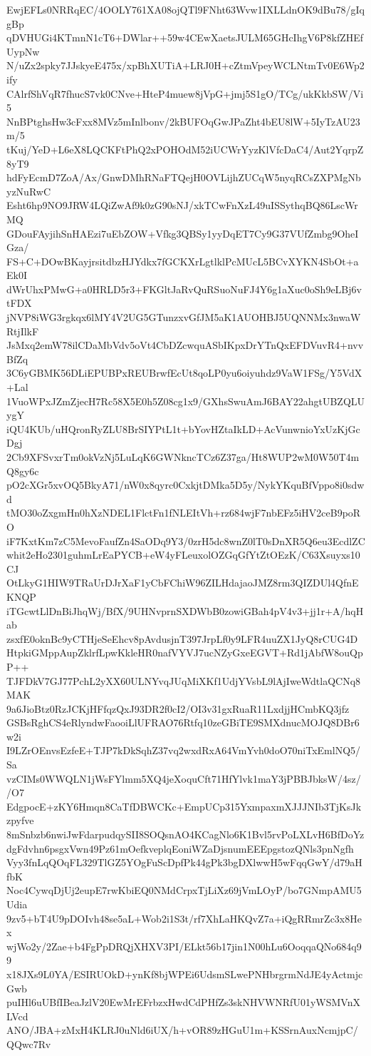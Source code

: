 EwjEFLs0NRRqEC/4OOLY761XA08ojQTl9FNht63Wvw1IXLLdnOK9dBu78/gIqgBp
qDVHUGi4KTmnN1cT6+DWlar++59w4CEwXaetsJULM65GHcIhgV6P8kfZHEfUypNw
N/uZx2spky7JJskyeE475x/xpBhXUTiA+LRJ0H+cZtmVpeyWCLNtmTv0E6Wp2ify
CAlrfShVqR7fhucS7vk0CNve+HteP4muew8jVpG+jmj5S1gO/TCg/ukKkbSW/Vi5
NnBPtghsHw3cFxx8MVz5mInlbonv/2kBUFOqGwJPaZht4bEU8lW+5IyTzAU23m/5
tKuj/YeD+L6eX8LQCKFtPhQ2xPOHOdM52iUCWrYyzKlVfcDaC4/Aut2YqrpZ8yT9
hdFyEcmD7ZoA/Ax/GnwDMhRNaFTQejH0OVLijhZUCqW5nyqRCsZXPMgNbyzNuRwC
Esht6hp9NO9JRW4LQiZwAf9k0zG90sNJ/xkTCwFnXzL49uISSythqBQ86LscWrMQ
GDouFAyjihSnHAEzi7uEbZOW+Vfkg3QBSy1yyDqET7Cy9G37VUfZmbg9OheIGza/
FS+C+DOwBKayjrsitdbzHJYdkx7fGCKXrLgtlklPcMUcL5BCvXYKN4SbOt+aEk0I
dWrUhxPMwG+a0HRLD5r3+FKGltJaRvQuRSuoNuFJ4Y6g1aXuc0oSh9eLBj6vtFDX
jNVP8iWG3rgkqx6lMY4V2UG5GTunzxvGfJM5aK1AUOHBJ5UQNNMx3nwaWRtjIlkF
JsMxq2emW78ilCDaMbVdv5oVt4CbDZcwquASbIKpxDrYTnQxEFDVuvR4+nvvBfZq
3C6yGBMK56DLiEPUBPxREUBrwfEcUt8qoLP0yu6oiyuhdz9VaW1FSg/Y5VdX+Lal
1VuoWPxJZmZjecH7Rc58X5E0h5Z08cg1x9/GXhsSwuAmJ6BAY22ahgtUBZQLUygY
iQU4KUb/uHQronRyZLU8BrSIYPtL1t+bYovHZtaIkLD+AcVunwnioYxUzKjGcDgj
2Cb9XFSvxrTm0okVzNj5LuLqK6GWNkncTCz6Z37ga/Ht8WUP2wM0W50T4mQ8gy6c
pO2cXGr5xvOQ5BkyA71/nW0x8qyrc0CxkjtDMka5D5y/NykYKquBfVppo8i0sdwd
tMO30oZxgmHn0hXzNDEL1FlctFn1fNLEItVh+rz684wjF7nbEFz5iHV2ceB9poRO
iF7KxtKm7zC5MevoFaufZn4SaODq9Y3/0zrH5dc8wnZ0lT0sDnXR5Q6eu3EcdlZC
whit2eHo2301guhmLrEaPYCB+eW4yFLeuxolOZGqGfYtZtOEzK/C63Xsuyxs10CJ
OtLkyG1HIW9TRaUrDJrXaF1yCbFChiW96ZILHdajaoJMZ8rm3QIZDUl4QfnEKNQP
iTGcwtLlDnBiJhqWj/BfX/9UHNvprnSXDWbB0zowiGBah4pV4v3+jj1r+A/hqHab
zsxfE0oknBc9yCTHjeSeEhcv8pAvdusjnT397JrpLf0y9LFR4uuZX1JyQ8rCUG4D
HtpkiGMppAupZklrfLpwKkleHR0nafVYVJ7ucNZyGxeEGVT+Rd1jAbfW8ouQpP++
TJFDkV7GJ77PchL2yXX60ULNYvqJUqMiXKf1UdjYVsbL9lAjIweWdtlaQCNq8MAK
9a6JioBtz0RzJCKjHFfqzQxJ93DR2f0cI2/OI3v31gxRuaR11LxdjjHCmbKQ3jfz
GSBsRghCS4eRlyndwFaooiLlUFRAO76Rtfq10zeGBiTE9SMXdnucMOJQ8DBr6w2i
I9LZrOEnvsEzfeE+TJP7kDkSqhZ37vq2wxdRxA64VmYvh0doO70niTxEmlNQ5/Sa
vzCIMs0WWQLN1jWsFYlmm5XQ4jeXoquCft71HfYlvk1maY3jPBBJbksW/4sz//O7
EdgpocE+zKY6Hmqn8CaTfDBWCKc+EmpUCp315YxmpaxmXJJJNIb3TjKsJkzpyfve
8mSnbzb6nwiJwFdarpudqySII8SOQsnAO4KCagNlo6K1Bvl5rvPoLXLvH6BfDoYz
dgFdvhn6psgxVwn49Pz61mOefkveplqEoniWZaDjsnumEEEpgstozQNls3pnNgfh
Vyy3fnLqQOqFL329TlGZ5YOgFuScDpfPk44gPk3bgDXlwwH5wFqqGwY/d79aHfbK
Noc4CywqDjUj2eupE7rwKbiEQ0NMdCrpxTjLiXz69jVmLOyP/bo7GNmpAMU5Udia
9zv5+bT4U9pDOIvh48se5aL+Wob2i1S3t/rf7XhLaHKQvZ7a+iQgRRmrZc3x8Hex
wjWo2y/2Zae+b4FgPpDRQjXHXV3PI/ELkt56b17jin1N00hLu6OoqqaQNo684q99
x18JXs9L0YA/ESIRUOkD+ynKf8bjWPEi6UdsmSLwePNHbrgrmNdJE4yActmjcGwb
puIHl6uUBfIBeaJzlV20EwMrEFrbzxHwdCdPHfZs3skNHVWNRfU01yWSMVnXLVcd
ANO/JBA+zMxH4KLRJ0uNld6iUX/h+vOR89zHGuU1m+KSSrnAuxNcmjpC/QQwc7Rv
